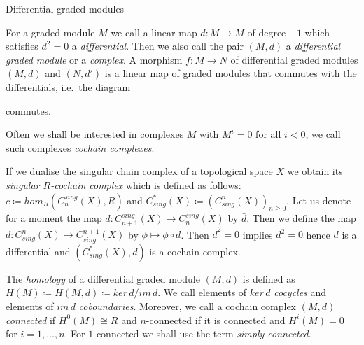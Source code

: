\begin{Definition}{Differential graded modules}

For a graded module $M$ we call a linear map $d \colon M \to M$ of degree $+1$ which satisfies $ d^2 = 0$ a \emph{differential}.
Then we also call the pair $(M , d)$ a \emph{differential graded module} or a \emph{complex}.
A morphism $f \colon M \to N$ of differential graded modules $(M,d)$ and $(N,d')$ is a linear map of graded modules that commutes with the 
differentials, i.e.\ the diagram \\

\centerline{
}
commutes.
\end{Definition}

Often we shall be interested in complexes $M$ with $M^i = 0$ for all $i < 0$, we call such complexes \emph{cochain complexes}.

\begin{Example}
 If we dualise the singular chain complex of a topological space $X$ we obtain its \emph{singular $R$-cochain complex} which 
 is defined as follows: \newline
 $c \coloneqq hom_R(C_n^{sing}(X),R)$ and $C^*_{sing}(X) \coloneqq (C^n_{sing}(X))_{n \geq 0}$. \newline
 Let us denote for a moment the map $d \colon C_{n+1}^{sing}(X) \to C_n^{sing}(X)$ by $\bar{d}$. Then we define the map
 $d \colon C_{sing}^n(X) \to C_{sing}^{n+1}(X)$ by $\phi \mapsto \phi \circ \bar{d}$. Then $\bar{d}^2 = 0$ implies $d^2 = 0$
 hence $d$ is a differential and $(C^*_{sing}(X),d)$ is a cochain complex.
\end{Example}

\begin{Definition}
The \emph{homology} of a differential graded module $(M,d)$ is defined as \newline ${H(M) \coloneqq 
H(M,d) \coloneqq ker \, d / im \, d}$.
We call elements of $ker \, d$ \emph{cocycles} and elements of $im \, d$ \emph{coboundaries}.
Moreover, we call a cochain complex $(M,d)$ \emph{connected} if $H^0(M) \cong R$ and $n$-connected if 
it is connected and $H^i(M) = 0$ for $i = 1, \dotsc, n$. For $1$-connected we shall use the term \emph{simply connected}.
\end{Definition}

